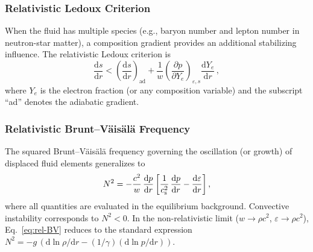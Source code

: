 \subsubsection{Relativistic Ledoux Criterion}
When the fluid has multiple species (e.g., baryon number and lepton
number in neutron-star matter), a composition gradient provides an
additional stabilizing influence.  The relativistic Ledoux criterion is
\begin{equation}
  \frac{\mathrm{d} s}{\mathrm{d} r}
  < \left(\frac{\mathrm{d} s}{\mathrm{d} r}\right)_{\!\text{ad}}
  + \frac{1}{w}\left(\frac{\partial p}{\partial Y_{e}}\right)_{\!\varepsilon,s}
    \frac{\mathrm{d} Y_{e}}{\mathrm{d} r}\,,
  \label{eq:rel-ledoux}
\end{equation}
where $Y_{e}$ is the electron fraction (or any composition variable)
and the subscript ``ad'' denotes the adiabatic gradient.

\subsubsection{Relativistic Brunt--V\"ais\"al\"a Frequency}
The squared Brunt--V\"ais\"al\"a frequency governing the oscillation
(or growth) of displaced fluid elements generalizes to
\begin{equation}
  N^{2}
  = -\frac{c^{2}}{w}\,\frac{\mathrm{d} p}{\mathrm{d} r}
    \left[
      \frac{1}{c_{\mathrm{s}}^{2}}\,\frac{\mathrm{d} p}{\mathrm{d} r}
      - \frac{\mathrm{d}\varepsilon}{\mathrm{d} r}
    \right],
  \label{eq:rel-BV}
\end{equation}
where all quantities are evaluated in the equilibrium background.
Convective instability corresponds to $N^{2} < 0$.  In the
non-relativistic limit ($w \to \rho c^{2}$, $\varepsilon \to \rho c^{2}$),
Eq.~\eqref{eq:rel-BV} reduces to the standard expression
$N^{2} = -g\,(\mathrm{d}\ln\rho/\mathrm{d} r - (1/\gamma)(\mathrm{d}\ln p/\mathrm{d} r))$.

